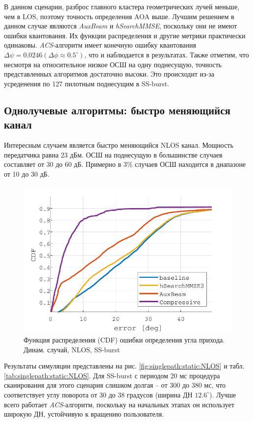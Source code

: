 В данном сценарии, разброс главного кластера геометрических лучей меньше, чем в
LOS, поэтому точность определения AOA выше. Лучшим решением в данном случае
являются \textit{AuxBeam} и \textit{hSearchMMSE}, поскольку они не имеют ошибки
квантования. Их функции распределения и другие метрики практически одинаковы.
\textit{ACS}-алгоритм имеет конечную ошибку квантования
$\Delta \psi = 0.0246 (\Delta \phi \approx 0.5^\circ)$, что и наблюдается в
результатах.  Также отметим, что несмотря на относительное низкое ОСШ на одну
поднесущую, точность представленных алгоритмов достаточно высоки. Это происходит
из-за усреденения по 127 пилотным поднесущим в SS-burst.

\subsection{Однолучевые алгоритмы: быстро меняющийся канал}
\label{sec:singlepath:rotation:NLOS}
Интересным случаем является быстро меняющийся NLOS канал. Мощность передатчика
равна 23 дБм.  ОСШ на поднесущую в большинстве случаев составляет от 30 до 60
дБ. Примерно в 3\% случаев ОСШ находится в диапазоне от 10 до 30 дБ.

\begin{figure}[ht]
  \centering
  \includegraphics{results/rus/singlepath-rotation-NLOS-1}
  \caption{Функция распределения (CDF) ошибки определения угла прихода. Динам. случай, NLOS, SS-burst}
  \label{fig:singlepath:rotation:NLOS-1}
\end{figure}
Результаты симуляции представлены на рис. \ref{fig:singlepath:static:NLOS} и
табл.  \ref{tab:singlepath:static:NLOS}.
Для SS-burst с периодом 20 мс процедура сканирования для этого сценария слишком долгая --
от 300 до 380 мс, что соответствует углу поворота от 30 до 38 градусов (ширина ДН $12.6^\circ$).
Лучше всего работает \textit{ACS}-алгоритм, поскольку на начальных этапах
он использует широкую ДН, устойчивую к вращению пользователя. 

